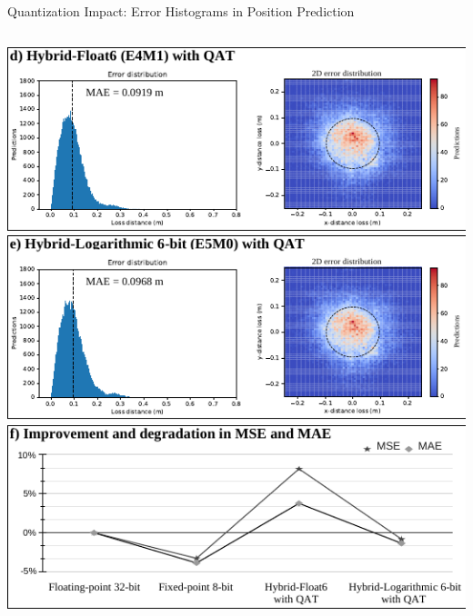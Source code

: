 \begin{frame}{Quantization Impact: Error Histograms in Position Prediction}
\begin{columns}[T]
		\begin{column}{0.5\textwidth}
			\centering
			\includegraphics[width=0.95\linewidth]{slides/figures/model_evaluation_d.pdf} %
			\pause %
			\includegraphics[width=0.95\linewidth]{slides/figures/model_evaluation_e.pdf} %
			\pause %
			\includegraphics[width=0.95\linewidth]{slides/figures/model_evaluation_f.pdf} %
		\end{column}
	\end{columns}
\end{frame}
